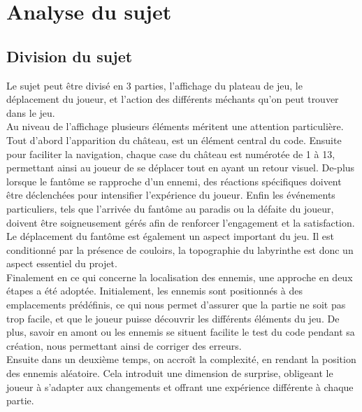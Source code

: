 \documentclass[titlepage]{report}
\begin{document}
\section{Analyse du sujet}
\subsection{Division du sujet}
\hspace*{0.5cm} Le sujet peut être divisé en 3 parties, l'affichage du plateau de jeu, le déplacement du joueur, et l'action des différents méchants qu'on peut trouver dans le jeu.\\
\hspace*{0.5cm}Au niveau de l'affichage plusieurs éléments méritent une attention particulière. Tout d'abord l'apparition du château, est un élément central du code. Ensuite pour faciliter la navigation, chaque case du château est numérotée de 1 à 13, permettant ainsi au joueur de se déplacer tout en ayant un retour visuel. De-plus lorsque le fantôme se rapproche d'un ennemi, des réactions spécifiques doivent être déclenchées pour intensifier l'expérience du joueur. Enfin les événements particuliers, tels que l'arrivée du fantôme au paradis ou la défaite du joueur, doivent être soigneusement gérés afin de renforcer l'engagement et la satisfaction.  \\
\hspace*{0.5cm}Le déplacement du fantôme est également un aspect important du jeu. Il est conditionné par la présence de couloirs, la topographie du labyrinthe est donc un aspect essentiel du projet.\\
\hspace*{0.5cm}Finalement en ce qui concerne la localisation des ennemis, une approche en deux étapes a été adoptée. Initialement, les ennemis sont positionnés à des emplacements prédéfinis, ce qui nous permet d'assurer que la partie ne soit pas trop facile, et que le joueur puisse découvrir les différents éléments du jeu. De plus, savoir en amont ou les ennemis se situent facilite le test du code pendant sa création, nous permettant ainsi de corriger des erreurs.\\
\hspace*{0.5cm}Ensuite dans un deuxième temps, on accroît la complexité, en rendant la position des ennemis aléatoire. Cela introduit une dimension de surprise, obligeant le joueur à s'adapter aux changements et offrant une expérience différente à chaque partie. 
\vspace*{0.5cm}
\end{document}

